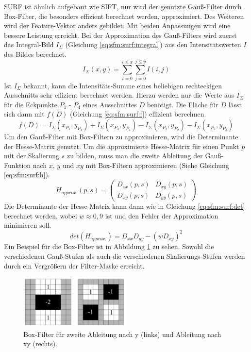 \documentclass[12pt,titlepage, twoside]{article}
\begin{document}
SURF \cite{SURF} ist ähnlich aufgebaut wie SIFT, nur wird der genutzte Gauß-Filter durch Box-Filter, die besonders effizient berechnet werden, approximiert.
Des Weiteren wird der Feature-Vektor anders gebildet. Mit beiden Anpassungen wird eine bessere Leistung erreicht.
Bei der Approximation des Gauß-Filters wird zuerst das Integral-Bild $I_\Sigma$ (Gleichung \ref{eq:sfm:surf:integral}) aus den Intensitätswerten $I$ des Bildes berechnet.
\begin{equation}
    \label{eq:sfm:surf:integral}
    I_\Sigma (x,y) = \sum_{i=0}^{i\leq x}\sum_{j=0}^{j\leq y}I(i,j)
\end{equation}
Ist $I_\Sigma$ bekannt, kann die Intensitäts-Summe eines beliebigen rechteckigen Ausschnitts sehr effizient berechnet werden. 
Hierzu werden nur die Werte aus $I_\Sigma$ für die Eckpunkte $P_1$ - $P_4$ eines Ausschnittes $D$ benötigt.
Die Fläche für $D$ lässt sich dann mit $f(D)$ (Gleichung \ref{eq:sfm:surf:f}) effizient berechnen.
\begin{equation}
    \label{eq:sfm:surf:f}
    f(D) = I_\Sigma(x_{P_1}, y_{P_1}) + I_\Sigma(x_{P_4}, y_{P_4}) - I_\Sigma(x_{P_2}, y_{P_2}) - I_\Sigma(x_{P_3}, y_{P_3})
\end{equation}
Um den Gauß-Filter mit Box-Filtern zu approximieren, wird die Determinante der Hesse-Matrix genutzt. 
Um die approximierte Hesse-Matrix für einen Punkt $p$ mit der Skalierung $s$ zu bilden, muss man die zweite Ableitung der Gauß-Funktion nach $x$, $y$ und $xy$ mit Box-Filtern approximieren (Siehe Gleichung \ref{eq:sfm:surf:h}).
\begin{equation}
    \label{eq:sfm:surf:h}
    H_{approx.}(p,s) = \left( \begin{smallmatrix} D_{xx}(p,s)&D_{xy}(p,s)\\ D_{xy}(p,s)&D_{yy}(p,s) \end{smallmatrix} \right)
\end{equation}
Die Determinante der Hesse-Matrix kann dann wie in Gleichung \ref{eq:sfm:surf:det} berechnet werden, wobei $w\approx 0,9$ ist und den Fehler der Approximation minimieren soll.
\begin{equation}
    \label{eq:sfm:surf:det}
    det(H_{approx.}) = D_{xx}D_{yy}-(wD_{xy})^2
\end{equation}
Ein Beispiel für die Box-Filter ist in Abbildung \ref{fig:surf:filter} zu sehen. Sowohl die verschiedenen Gauß-Stufen als auch die verschiedenen Skalierungs-Stufen werden durch ein Vergrößern der Filter-Maske erreicht.
\begin{figure}
    \centering
    \includegraphics[width=0.5\textwidth]{./Images/SURF_BoxFilter.png}
    \caption{Box-Filter für zweite Ableitung nach y (links) und Ableitung nach xy (rechts). \cite{SURF}}
    \label{fig:surf:filter}
\end{figure}
\end{document}
